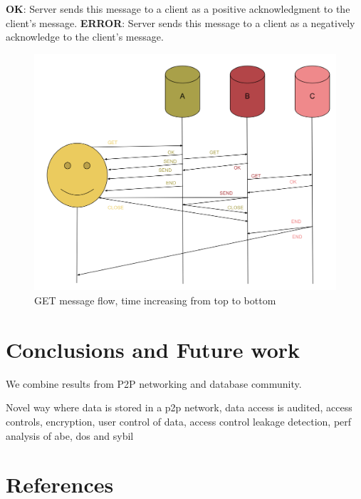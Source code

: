 \documentclass[preprint,10pt]{elsarticle}
\newcommand{\fscale}[1]{#1\linewidth}
\theoremstyle{definition}
\begin{document}
\textbf{OK}: Server sends this message to a client as a positive acknowledgment to the client's message.
\newline
\newline
\textbf{ERROR}: Server sends this message to a client as a negatively acknowledge to the client's message.
\begin{figure}[h!] \centering
	\includegraphics[width=\fscale{1}]{mx.png}
	\caption{GET message flow, time increasing from top to bottom}
	\label{fig:mx}
\end{figure}

\section{Conclusions and Future work}
We combine results from P2P networking and database community.

Novel way where data is stored in a p2p network, data access is audited, access controls, encryption, user control of data, access control leakage detection,  perf analysis of abe, dos and sybil
\section{References}



\end{document}
